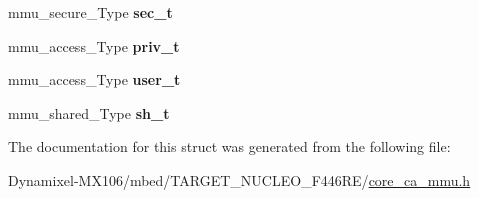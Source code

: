 \begin{DoxyCompactItemize}
\item 
mmu\+\_\+secure\+\_\+\+Type {\bfseries sec\+\_\+t}\hypertarget{struct_region_struct_ae8004f07bc61c36f27bd8b881e04b597}{}\label{struct_region_struct_ae8004f07bc61c36f27bd8b881e04b597}

\item 
mmu\+\_\+access\+\_\+\+Type {\bfseries priv\+\_\+t}\hypertarget{struct_region_struct_aca1e31dc5efb9db558fde5d0acc392c7}{}\label{struct_region_struct_aca1e31dc5efb9db558fde5d0acc392c7}

\item 
mmu\+\_\+access\+\_\+\+Type {\bfseries user\+\_\+t}\hypertarget{struct_region_struct_a0f45fe48c95fb9674571f6f085aa862e}{}\label{struct_region_struct_a0f45fe48c95fb9674571f6f085aa862e}

\item 
mmu\+\_\+shared\+\_\+\+Type {\bfseries sh\+\_\+t}\hypertarget{struct_region_struct_a7c73b178aa8eadb16dbe1aba75f3c5ad}{}\label{struct_region_struct_a7c73b178aa8eadb16dbe1aba75f3c5ad}

\end{DoxyCompactItemize}


The documentation for this struct was generated from the following file\+:\begin{DoxyCompactItemize}
\item 
Dynamixel-\/\+M\+X106/mbed/\+T\+A\+R\+G\+E\+T\+\_\+\+N\+U\+C\+L\+E\+O\+\_\+\+F446\+R\+E/\hyperlink{core__ca__mmu_8h}{core\+\_\+ca\+\_\+mmu.\+h}\end{DoxyCompactItemize}
